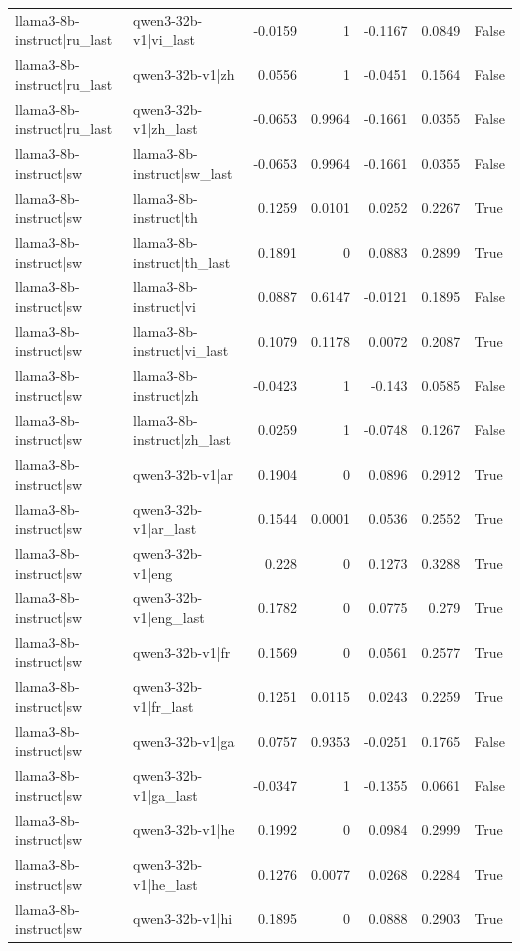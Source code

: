 \begin{table}
\begin{tabular}{l l r r r r l}
llama3-8b-instruct|ru_last & qwen3-32b-v1|vi_last & -0.0159 & 1 & -0.1167 & 0.0849 & False \\
llama3-8b-instruct|ru_last & qwen3-32b-v1|zh & 0.0556 & 1 & -0.0451 & 0.1564 & False \\
llama3-8b-instruct|ru_last & qwen3-32b-v1|zh_last & -0.0653 & 0.9964 & -0.1661 & 0.0355 & False \\
llama3-8b-instruct|sw & llama3-8b-instruct|sw_last & -0.0653 & 0.9964 & -0.1661 & 0.0355 & False \\
llama3-8b-instruct|sw & llama3-8b-instruct|th & 0.1259 & 0.0101 & 0.0252 & 0.2267 & True \\
llama3-8b-instruct|sw & llama3-8b-instruct|th_last & 0.1891 & 0 & 0.0883 & 0.2899 & True \\
llama3-8b-instruct|sw & llama3-8b-instruct|vi & 0.0887 & 0.6147 & -0.0121 & 0.1895 & False \\
llama3-8b-instruct|sw & llama3-8b-instruct|vi_last & 0.1079 & 0.1178 & 0.0072 & 0.2087 & True \\
llama3-8b-instruct|sw & llama3-8b-instruct|zh & -0.0423 & 1 & -0.143 & 0.0585 & False \\
llama3-8b-instruct|sw & llama3-8b-instruct|zh_last & 0.0259 & 1 & -0.0748 & 0.1267 & False \\
llama3-8b-instruct|sw & qwen3-32b-v1|ar & 0.1904 & 0 & 0.0896 & 0.2912 & True \\
llama3-8b-instruct|sw & qwen3-32b-v1|ar_last & 0.1544 & 0.0001 & 0.0536 & 0.2552 & True \\
llama3-8b-instruct|sw & qwen3-32b-v1|eng & 0.228 & 0 & 0.1273 & 0.3288 & True \\
llama3-8b-instruct|sw & qwen3-32b-v1|eng_last & 0.1782 & 0 & 0.0775 & 0.279 & True \\
llama3-8b-instruct|sw & qwen3-32b-v1|fr & 0.1569 & 0 & 0.0561 & 0.2577 & True \\
llama3-8b-instruct|sw & qwen3-32b-v1|fr_last & 0.1251 & 0.0115 & 0.0243 & 0.2259 & True \\
llama3-8b-instruct|sw & qwen3-32b-v1|ga & 0.0757 & 0.9353 & -0.0251 & 0.1765 & False \\
llama3-8b-instruct|sw & qwen3-32b-v1|ga_last & -0.0347 & 1 & -0.1355 & 0.0661 & False \\
llama3-8b-instruct|sw & qwen3-32b-v1|he & 0.1992 & 0 & 0.0984 & 0.2999 & True \\
llama3-8b-instruct|sw & qwen3-32b-v1|he_last & 0.1276 & 0.0077 & 0.0268 & 0.2284 & True \\
llama3-8b-instruct|sw & qwen3-32b-v1|hi & 0.1895 & 0 & 0.0888 & 0.2903 & True \\

\end{tabular}
\end{table}
